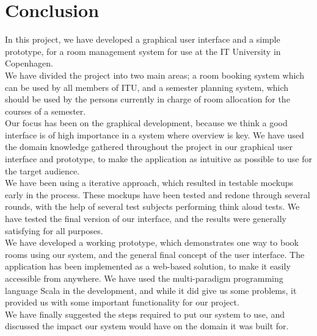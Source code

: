\chapter{Conclusion}
In this project, we have developed a graphical user interface and a simple prototype, for a room management system for use at the IT University in Copenhagen.\\
We have divided the project into two main areas; a room booking system which can be used by all members of ITU, and a semester planning system, which should be used by the persons currently in charge of room allocation for the courses of a semester.\\
Our focus has been on the graphical development, because we think a good interface is of high importance in a system where overview is key. We have used the domain knowledge gathered throughout the project in our graphical user interface and prototype, to make the application as intuitive as possible to use for the target audience. \\

We have been using a iterative approach, which resulted in testable mockups early in the process. These mockups have been tested and redone through several rounds, with the help of several test subjects performing think aloud tests. We have tested the final version of our interface, and the results were generally satisfying for all purposes.\\

We have developed a working prototype, which demonstrates one way to book rooms using our system, and the general final concept of the user interface. The application has been implemented as a web-based solution, to make it easily accessible from anywhere. We have used the multi-paradigm programming language Scala in the development, and while it did give us some problems, it provided us with some important functionality for our project.\\

We have finally suggested the steps required to put our system to use, and discussed the impact our system would have on the domain it was built for.